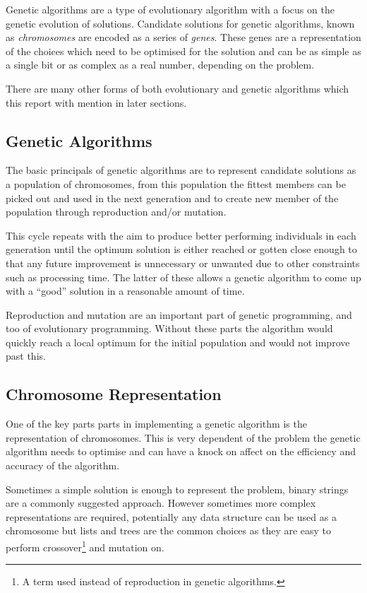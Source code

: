 \documentclass[10pt, a4paper]{article}
\begin{document}
Genetic algorithms are a type of evolutionary algorithm with a focus on the 
genetic evolution of solutions. Candidate solutions for genetic algorithms, 
known as \textit{chromosomes} are encoded as a series of \textit{genes}. These
genes are a representation of the choices which need to be optimised for the 
solution and can be as simple as a single bit or as complex as a real number, 
depending on the problem.

There are many other forms of both evolutionary and genetic algorithms which
this report with mention in later sections.


\subsection{Genetic Algorithms}
The basic principals of genetic algorithms are to represent candidate solutions
as a population of chromosomes, from this population the fittest members can be
picked out and used in the next generation and to create new member of the 
population through reproduction and/or mutation.

This cycle repeats with the aim to produce better performing individuals in 
each generation until the optimum solution is either reached or gotten close
enough to that any future improvement is unnecessary or unwanted due to
other constraints such as processing time. The latter of these allows a genetic
algorithm to come up with a ``good'' solution in a reasonable amount of time.

Reproduction and mutation are an important part of genetic programming, and too
of evolutionary programming. Without these parts the algorithm would quickly 
reach a local optimum for the initial population and would not improve past 
this.

\subsection{Chromosome Representation}
One of the key parts parts in implementing a genetic algorithm is the 
representation of chromosomes. This is very dependent of the problem the 
genetic algorithm needs to optimise and can have a knock on affect on the 
efficiency and accuracy of the algorithm.

Sometimes a simple solution is enough to represent the problem, binary strings
are a commonly suggested approach. However sometimes more complex 
representations are required, potentially any data structure can be used as a
chromosome but lists and trees are the common choices as they are easy to 
perform crossover\footnote{A term used instead of reproduction in genetic 
algorithms.} and mutation on.
\end{document}
